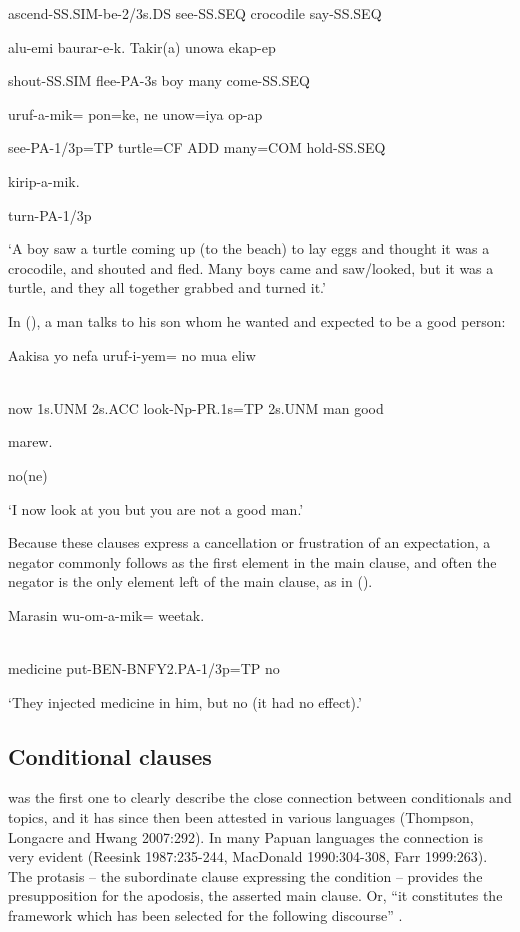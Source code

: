 ascend-SS.SIM-be-2/3s.DS  see-SS.SEQ  crocodile  say-SS.SEQ

alu-emi  baurar-e-k.  Takir(a)  unowa  ekap-ep

shout-SS.SIM  flee-PA-3s  boy  many  come-SS.SEQ  

uruf-a-mik=  pon=ke,  ne  unow=iya  op-ap

see-PA-1/3p=TP  turtle=CF  ADD  many=COM  hold-SS.SEQ  

kirip-a-mik.

turn-PA-1/3p

`A boy saw a turtle coming up (to the beach) to lay eggs and thought it was a crocodile, and shouted and fled. Many boys came and saw/looked, but it was a turtle, and they all together grabbed and turned it.'

In (), a man talks to his son whom he wanted and expected to be a good person:

\ea%
\label{ex:x1397}
\gll Aakisa  yo  nefa  uruf-i-yem=  no  mua  eliw \\
      \\
\glt
\z

now  1s.UNM  2s.ACC  look-Np-PR.1s=TP  2s.UNM  man  good

marew.

no(ne)

`I now look at you but you are not a good man.'

Because these clauses express a cancellation or frustration of an expectation, a negator commonly follows as the first element in the main clause, and often the negator is the only element left of the main clause, as in ().

\ea%
\label{ex:x1398}
\gll Marasin  wu-om-a-mik=  weetak. \\
      \\
\glt
\z

medicine  put-BEN-BNFY2.PA-1/3p=TP  no

`They injected medicine in him, but no (it had no effect).'

\subsection{Conditional clauses} 
\hypertarget{RefHeading23701935131865}{}
\citet{Haiman1978} was the first one to clearly describe the close connection between conditionals and topics, and it has since then been attested in various languages (Thompson, Longacre and Hwang 2007:292). In many Papuan languages the connection is very evident (Reesink 1987:235-244, MacDonald 1990:304-308, Farr 1999:263). The protasis -- the subordinate clause expressing the condition -- provides the presupposition for the apodosis, the asserted main clause. Or, ``it constitutes the framework which has been selected for the following discourse'' \citep[585]{Haiman1978}.

